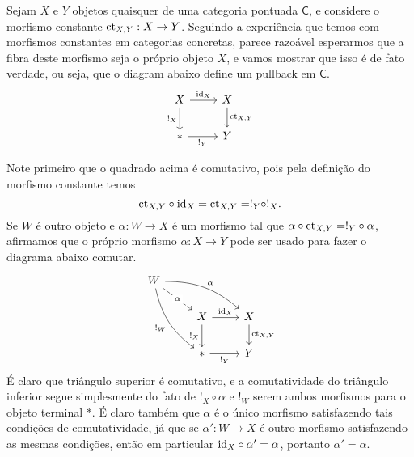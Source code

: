 \begin{exem}
  \label{exem:fibra_morfismo_constate}
  Sejam $X$ e $Y$ objetos quaisquer de uma categoria pontuada $\mathsf{C}$, e considere o morfismo constante $\mathrm{ct}_{X,Y}: X \to Y$.
  Seguindo a experiência que temos com morfismos constantes em categorias concretas, parece razoável esperarmos que a fibra deste morfismo seja o próprio objeto $X$, e vamos mostrar que isso é de fato verdade, ou seja, que o diagram abaixo define um pullback em $\mathsf{C}$.
  \begin{displaymath}
    \begin{tikzcd}
      X
      \arrow[r, "\id_{X}"]
      \arrow[d, "!_{X}" swap]
      & X
      \arrow[d, "{\ct_{X,Y}}"]
      \\ *
      \arrow[r, "!_{Y}" swap]
      & Y
    \end{tikzcd}
  \end{displaymath}

  Note primeiro que o quadrado acima é comutativo, pois pela definição do morfismo constante temos
  \begin{displaymath}
    \mathrm{ct}_{X,Y} \circ \mathrm{id}_{X} = \mathrm{ct}_{X,Y} = !_{Y} \circ !_{X}.
  \end{displaymath}
  Se $W$ é outro objeto e $\alpha: W \to X$ é um morfismo tal que $\alpha \circ \mathrm{ct}_{X,Y} = !_{Y} \circ \alpha$, afirmamos que o próprio morfismo $\alpha: X \to Y$ pode ser usado para fazer o diagrama abaixo comutar.
  \begin{displaymath}
    \begin{tikzcd}
      W
      \arrow[rrd, bend left=20, "\alpha"]
      \arrow[rdd, bend right=20, "!_{W}" swap]
      \arrow[rd, dashed, "\alpha" description]
      \\ & X
      \arrow[d, "!_{X}" swap]
      \arrow[r, "\id_{X}"]
      & X
      \arrow[d, "{\ct_{X,Y}}"]
      \\ & *
      \arrow[r, "!_{Y}" swap]
      & Y
    \end{tikzcd}
  \end{displaymath}
  É claro que triângulo superior é comutativo, e a comutatividade do triângulo inferior segue simplesmente do fato de $!_{X} \circ \alpha$ e $!_{W}$ serem ambos morfismos para o objeto terminal $*$.
  É claro também que $\alpha$ é o único morfismo satisfazendo tais condições de comutatividade, já que se $\alpha': W \to X$ é outro morfismo satisfazendo as mesmas condições, então em particular $\mathrm{id}_{X} \circ \alpha' = \alpha$, portanto $\alpha' = \alpha$.
\end{exem}

